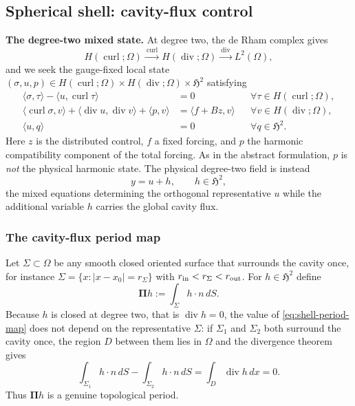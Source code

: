 \documentclass{article}
\DeclareMathOperator{\curl}{curl}
\DeclareMathOperator{\divergence}{div}
\newcommand{\HH}{\mathfrak H}
\newcommand{\Piop}{\boldsymbol\Pi}
\newcommand{\ip}[2]{\langle #1,#2\rangle}
\begin{document}
\subsection{Spherical shell: cavity-flux control}\label{sec:shell}

\medskip
\noindent\textbf{The degree-two mixed state.}
At degree two, the de Rham complex gives
\[
  H(\curl;\Omega)\xrightarrow{\ \curl\ }
  H(\divergence;\Omega)\xrightarrow{\ \divergence\ }L^2(\Omega),
\]
and we seek the gauge-fixed local state
$(\sigma,u,p)\in H(\curl;\Omega)\times H(\divergence;\Omega)\times\HH^2$
satisfying
\begin{subequations}\label{eq:shell-mixed}
\begin{align}
  \ip{\sigma}{\tau}-\ip{u}{\curl\tau} &= 0
    &&\forall\tau\in H(\curl;\Omega),\\
  \ip{\curl\sigma}{v}+\ip{\divergence u}{\divergence v}+\ip{p}{v}
    &= \ip{f+Bz}{v}
    &&\forall v\in H(\divergence;\Omega),\\
  \ip{u}{q} &= 0 &&\forall q\in\HH^2 .
\end{align}
\end{subequations}
Here $z$ is the distributed control, $f$ a fixed forcing, and $p$ the
harmonic compatibility component of the total forcing. As in the
abstract formulation, $p$ is \emph{not} the physical harmonic state.
The physical degree-two field is instead
\begin{equation}\label{eq:shell-split}
  y=u+h,\qquad h\in\HH^2 ,
\end{equation}
the mixed equations determining the orthogonal representative $u$ while
the additional variable $h$ carries the global cavity flux.
 
\subsubsection{The cavity-flux period map}
\label{sec:shell-period}
 
Let $\Sigma\subset\Omega$ be any smooth closed oriented surface that
surrounds the cavity once, for instance
$\Sigma=\{x:|x-x_0|=r_\Sigma\}$ with
$r_{\rm in}<r_\Sigma<r_{\rm out}$. For $h\in\HH^2$ define
\begin{equation}\label{eq:shell-period-map}
  \Piop h:=\int_\Sigma h\cdot n\,dS .
\end{equation}
Because $h$ is closed at degree two, that is $\divergence h=0$, the
value of \eqref{eq:shell-period-map} does not depend on the
representative $\Sigma$: if $\Sigma_1$ and $\Sigma_2$ both surround the
cavity once, the region $D$ between them lies in $\Omega$ and the
divergence theorem gives
\[
  \int_{\Sigma_1}h\cdot n\,dS-\int_{\Sigma_2}h\cdot n\,dS
  =\int_D\divergence h\,dx=0 .
\]
Thus $\Piop h$ is a genuine topological period.
 
\end{document}
